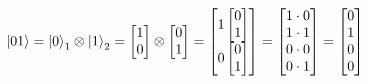 \documentclass{article}
\begin{document}
\begin{equation}
    \ket{01} = \ket{0}_1 \otimes \ket{1}_2 = 
    \begin{bmatrix}
    1\\
    0
    \end{bmatrix}
    \otimes\begin{bmatrix}
    0\\
    1
    \end{bmatrix} = 
    \begin{bmatrix}
    1\begin{bmatrix}
    0\\
    1
    \end{bmatrix}\\
    0\begin{bmatrix}
    0\\
    1
    \end{bmatrix}
    \end{bmatrix} = \begin{bmatrix}
    1 \cdot 0\\
    1 \cdot 1\\
    0 \cdot 0\\
    0 \cdot 1\\
    \end{bmatrix} = \begin{bmatrix}
    0\\
    1\\
    0\\
    0\\
    \end{bmatrix}
\end{equation}
\end{document}
